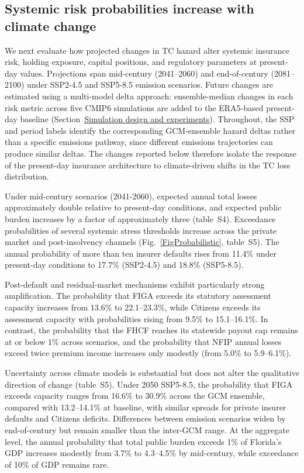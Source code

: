 \documentclass[fleqn,10pt]{wlscirep}
\newcommand{\SITabIV}{table~S4}
\newcommand{\SITabV}{table~S5}
\begin{document}
\subsection*{Systemic risk probabilities increase with climate change}\label{ResultsClimate}
We next evaluate how projected changes in TC hazard alter systemic insurance risk, holding exposure, capital positions, and regulatory parameters at present-day values. Projections span mid-century (2041--2060) and end-of-century (2081--2100) under SSP2-4.5 and SSP5-8.5 emission scenarios. Future changes are estimated using a multi-model delta approach: ensemble-median changes in each risk metric across five CMIP6 simulations are added to the ERA5-based present-day baseline (Section~\hyperref[MethodsFutureClim]{Simulation design and experiments}). Throughout, the SSP and period labels identify the corresponding GCM-ensemble hazard deltas rather than a specific emissions pathway, since different emissions trajectories can produce similar deltas. The changes reported below therefore isolate the response of the present-day insurance architecture to climate-driven shifts in the TC loss distribution.\medskip

Under mid-century scenarios (2041-2060), expected annual total losses approximately double relative to present-day conditions, and expected public burden increases by a factor of approximately three (\SITabIV). Exceedance probabilities of several systemic stress thresholds increase across the private market and post-insolvency channels (Fig.~\ref{FigProbabilistic}, \SITabV). The annual probability of more than ten insurer defaults rises from 11.4\% under present-day conditions to 17.7\% (SSP2-4.5) and 18.8\% (SSP5-8.5).\medskip

Post-default and residual-market mechanisms exhibit particularly strong amplification. The probability that FIGA exceeds its statutory assessment capacity increases from 13.6\% to 22.1--23.3\%, while Citizens exceeds its assessment capacity with probabilities rising from 9.5\% to 15.1--16.1\%. In contrast, the probability that the FHCF reaches its statewide payout cap remains at or below 1\% across scenarios, and the probability that NFIP annual losses exceed twice premium income increases only modestly (from 5.0\% to 5.9--6.1\%).\medskip

Uncertainty across climate models is substantial but does not alter the qualitative direction of change (\SITabV). Under 2050 SSP5-8.5, the probability that FIGA exceeds capacity ranges from 16.6\% to 30.9\% across the GCM ensemble, compared with 13.2--14.1\% at baseline, with similar spreads for private insurer defaults and Citizens deficits. Differences between emission scenarios widen by end-of-century but remain smaller than the inter-GCM range.
At the aggregate level, the annual probability that total public burden exceeds 1\% of Florida's GDP increases modestly from 3.7\% to 4.3--4.5\% by mid-century, while exceedance of 10\% of GDP remains rare.\medskip
\end{document}
